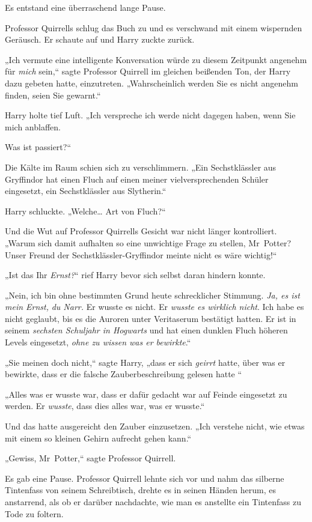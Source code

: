 {Es entstand eine überraschend lange Pause.

Professor Quirrells schlug das Buch zu und es verschwand mit einem wispernden Geräusch. Er schaute auf und Harry zuckte zurück.

„Ich vermute eine intelligente Konversation würde zu diesem Zeitpunkt angenehm für \emph{mich} sein,“ sagte Professor Quirrell im gleichen beißenden Ton, der Harry dazu gebeten hatte, einzutreten. „Wahrscheinlich werden Sie es nicht angenehm finden, seien Sie gewarnt.“

Harry holte tief Luft. „Ich verspreche ich werde nicht dagegen haben, wenn Sie mich anblaffen.

Was ist passiert?“

Die Kälte im Raum schien sich zu verschlimmern. „Ein Sechstklässler aus Gryffindor hat einen Fluch auf einen meiner vielversprechenden Schüler eingesetzt, ein Sechstklässler aus Slytherin.“

Harry schluckte. „Welche… Art von Fluch?“

Und die Wut auf Professor Quirrells Gesicht war nicht länger kontrolliert. „Warum sich damit aufhalten so eine unwichtige Frage zu stellen, Mr~Potter? Unser Freund der Sechstklässler-Gryffindor meinte nicht es wäre wichtig!“

„Ist das Ihr \emph{Ernst?}“ rief Harry bevor sich selbst daran hindern konnte.

„Nein, ich bin ohne bestimmten Grund heute schrecklicher Stimmung. \emph{Ja, es ist mein Ernst,} \emph{du Narr.} Er wusste es nicht. Er \emph{wusste es wirklich nicht}. Ich habe es nicht geglaubt, bis es die Auroren unter Veritaserum bestätigt hatten. Er ist in seinem \emph{sechsten Schuljahr in Hogwarts} und hat einen dunklen Fluch höheren Levels eingesetzt, \emph{ohne zu wissen was er bewirkte}.“

„Sie meinen doch nicht,“ sagte Harry, „dass er sich \emph{geirrt} hatte, über was er bewirkte, dass er die falsche Zauberbeschreibung gelesen hatte \later“

„Alles was er wusste war, dass er dafür gedacht war auf Feinde eingesetzt zu werden. Er \emph{wusste}, dass dies alles war, was er wusste.“

Und das hatte ausgereicht den Zauber einzusetzen. „Ich verstehe nicht, wie etwas mit einem so kleinen Gehirn aufrecht gehen kann.“

„Gewiss, Mr~Potter,“ sagte Professor Quirrell.

Es gab eine Pause. Professor Quirrell lehnte sich vor und nahm das silberne Tintenfass von seinem Schreibtisch, drehte es in seinen Händen herum, es anstarrend, als ob er darüber nachdachte, wie man es anstellte ein Tintenfass zu Tode zu foltern.

}
